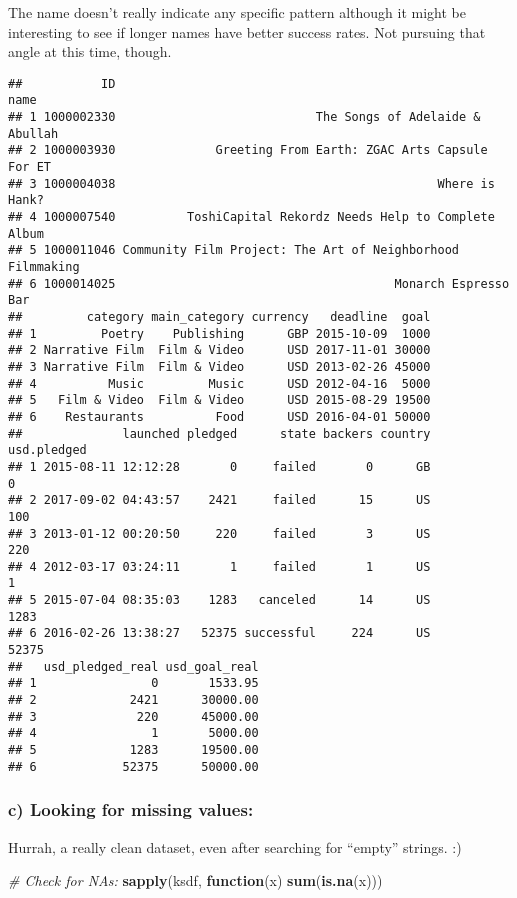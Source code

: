 \documentclass[]{article}
\newenvironment{Shaded}{\begin{snugshade}}{\end{snugshade}}
\newcommand{\KeywordTok}[1]{\textcolor[rgb]{0.13,0.29,0.53}{\textbf{#1}}}
\newcommand{\CommentTok}[1]{\textcolor[rgb]{0.56,0.35,0.01}{\textit{#1}}}
\newcommand{\ControlFlowTok}[1]{\textcolor[rgb]{0.13,0.29,0.53}{\textbf{#1}}}
\newcommand{\NormalTok}[1]{#1}
\begin{document}
The name doesn't really indicate any specific pattern although it might
be interesting to see if longer names have better success rates. Not
pursuing that angle at this time, though.

\begin{verbatim}
##           ID                                                       name
## 1 1000002330                            The Songs of Adelaide & Abullah
## 2 1000003930              Greeting From Earth: ZGAC Arts Capsule For ET
## 3 1000004038                                             Where is Hank?
## 4 1000007540          ToshiCapital Rekordz Needs Help to Complete Album
## 5 1000011046 Community Film Project: The Art of Neighborhood Filmmaking
## 6 1000014025                                       Monarch Espresso Bar
##         category main_category currency   deadline  goal
## 1         Poetry    Publishing      GBP 2015-10-09  1000
## 2 Narrative Film  Film & Video      USD 2017-11-01 30000
## 3 Narrative Film  Film & Video      USD 2013-02-26 45000
## 4          Music         Music      USD 2012-04-16  5000
## 5   Film & Video  Film & Video      USD 2015-08-29 19500
## 6    Restaurants          Food      USD 2016-04-01 50000
##              launched pledged      state backers country usd.pledged
## 1 2015-08-11 12:12:28       0     failed       0      GB           0
## 2 2017-09-02 04:43:57    2421     failed      15      US         100
## 3 2013-01-12 00:20:50     220     failed       3      US         220
## 4 2012-03-17 03:24:11       1     failed       1      US           1
## 5 2015-07-04 08:35:03    1283   canceled      14      US        1283
## 6 2016-02-26 13:38:27   52375 successful     224      US       52375
##   usd_pledged_real usd_goal_real
## 1                0       1533.95
## 2             2421      30000.00
## 3              220      45000.00
## 4                1       5000.00
## 5             1283      19500.00
## 6            52375      50000.00
\end{verbatim}

\subsubsection{c) Looking for missing
values:}\label{c-looking-for-missing-values}

Hurrah, a really clean dataset, even after searching for ``empty''
strings. :)

\begin{Shaded}
\begin{Highlighting}[]
\CommentTok{# Check for NAs:}
\KeywordTok{sapply}\NormalTok{(ksdf, }\ControlFlowTok{function}\NormalTok{(x) }\KeywordTok{sum}\NormalTok{(}\KeywordTok{is.na}\NormalTok{(x)))}
\end{Highlighting}
\end{Shaded}
\end{document}
